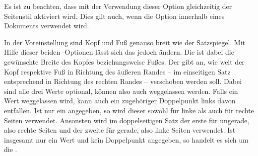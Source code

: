 Es ist zu beachten, dass mit der Verwendung dieser Option
gleichzeitig der Seitenstil
%
 aktiviert wird.
\iftrue%
Dies gilt auch, wenn die Option innerhalb eines Dokuments verwendet wird.%
\fi
%
\EndIndexGroup




\begin{Declaration}
\end{Declaration}
In der Voreinstellung sind Kopf und
Fuß genauso breit wie der Satzspiegel. Mit Hilfe dieser
beiden \KOMAScript-Optionen lässt sich das jedoch ändern. Die 
ist dabei die gewünschte Breite des Kopfes beziehungsweise Fußes. Der
 gibt an, wie weit der Kopf respektive Fuß in Richtung des
äußeren Randes -- im einseitigen Satz entsprechend in Richtung des rechten
Randes -- verschoben werden soll. Dabei sind alle
drei Werte optional, können also
auch weggelassen werden. Falls ein Wert weggelassen wird, kann auch ein
zugehöriger Doppelpunkt links davon entfallen. Ist nur ein 
angegeben, so wird dieser sowohl für linke als auch für rechte Seiten
verwendet. Ansonsten wird im doppelseitigen Satz der erste  für
ungerade, also rechte Seiten und der zweite für gerade, also linke Seiten
verwendet. Ist insgesamt nur ein Wert und kein Doppelpunkt angegeben, so
handelt es sich um die .

